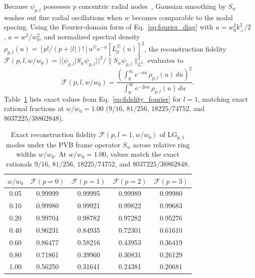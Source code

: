 \documentclass[aps,pra,onecolumn,notitlepage,11pt,tightenlines,amsmath,amssymb,floatfix,longbibliography]{revtex4-2}
\providecommand{\braket}[2]{\langle#1\vert#2\rangle}
\providecommand{\abs}[1]{\lvert#1\rvert}
\providecommand{\norm}[1]{\lVert#1\rVert}
\begin{document}
Because $\psi_{p,l}$ possesses $p$ concentric radial nodes~\cite{Allen1992,Siegman1986,Walborn2010}, Gaussian smoothing by $S_w$ washes out fine radial oscillations when $w$ becomes comparable to the nodal spacing. Using the Fourier-domain form of Eq.~\eqref{eq:fourier_diag} with $u = w_0^2 k_\perp^2/2$, $a = w^2/w_0^2$, and normalized spectral density $\rho_{p,l}(u) = [p!/(p+\abs{l})!]u^{\abs{l}} e^{-u}[L_p^{\abs{l}}(u)]^2$, the reconstruction fidelity $\mathcal{F}(p,l,w/w_0) = \abs{\braket{\psi_{p,l}}{S_w\psi_{p,l}}}^2/\norm{S_w\psi_{p,l}}_{L^2}^2$ evaluates to
\begin{equation}
\mathcal{F}(p,l,w/w_0) = \frac{\left(\int_0^\infty e^{-au}\,\rho_{p,l}(u)\,du\right)^2}{\int_0^\infty e^{-2au}\,\rho_{p,l}(u)\,du}.
\label{eq:fidelity_fourier}
\end{equation}
Table~\ref{tab:fidelity} lists exact values from Eq.~\eqref{eq:fidelity_fourier} for $l=1$, matching exact rational fractions at $w/w_0 = 1.00$ ($9/16$, $81/256$, $18225/74752$, and $8037225/38862848$).

\begin{table}[htbp]
\caption{Exact reconstruction fidelity $\mathcal{F}(p, l=1, w/w_0)$ of $\mathrm{LG}_{p,1}$ modes under the PVB frame operator $S_w$ across relative ring widths $w/w_0$. At $w/w_0 = 1.00$, values match the exact rationals $9/16$, $81/256$, $18225/74752$, and $8037225/38862848$.}
\label{tab:fidelity}
\begin{ruledtabular}
\setlength{\tabcolsep}{3pt}
\begin{tabular}{ccccc}
$w / w_0$ & $\mathcal{F}(p=0)$ & $\mathcal{F}(p=1)$ & $\mathcal{F}(p=2)$ & $\mathcal{F}(p=3)$ \\
\hline
0.05 & 0.99999 & 0.99995 & 0.99989 & 0.99980 \\
0.10 & 0.99980 & 0.99921 & 0.99822 & 0.99683 \\
0.20 & 0.99704 & 0.98782 & 0.97282 & 0.95276 \\
0.40 & 0.96231 & 0.84935 & 0.72301 & 0.61610 \\
0.60 & 0.86477 & 0.58216 & 0.43953 & 0.36419 \\
0.80 & 0.71861 & 0.39960 & 0.30831 & 0.26129 \\
1.00 & 0.56250 & 0.31641 & 0.24381 & 0.20681 \\
\end{tabular}
\end{ruledtabular}
\end{table}
\end{document}
